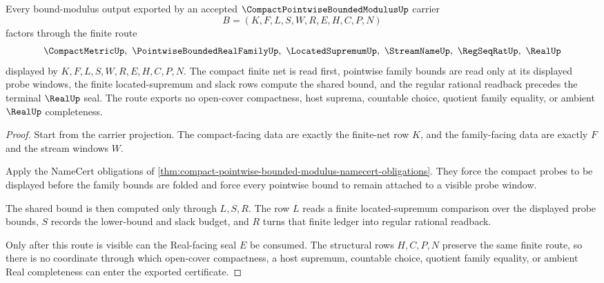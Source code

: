 \begin{theorem}
\label{thm:compact-pointwise-bounded-modulus-finite-net-bound}
Every bound-modulus output exported by an accepted $\CompactPointwiseBoundedModulusUp$ carrier
$$
B=(K,F,L,S,W,R,E,H,C,P,N)
$$
factors through the finite route
$$
\CompactMetricUp,\ \PointwiseBoundedRealFamilyUp,\ \LocatedSupremumUp,\ \StreamNameUp,\ \RegSeqRatUp,\ \RealUp
$$
displayed by $K,F,L,S,W,R,E,H,C,P,N$. The compact finite net is read first, pointwise family bounds are read only at its displayed probe windows, the finite located-supremum and slack rows compute the shared bound, and the regular rational readback precedes the terminal $\RealUp$ seal. The route exports no open-cover compactness, host suprema, countable choice, quotient family equality, or ambient $\RealUp$ completeness.
\end{theorem}
\begin{proof}
Start from the carrier projection. The compact-facing data are exactly the finite-net row $K$, and the family-facing data are exactly $F$ and the stream windows $W$.

Apply the NameCert obligations of \autoref{thm:compact-pointwise-bounded-modulus-namecert-obligations}. They force the compact probes to be displayed before the family bounds are folded and force every pointwise bound to remain attached to a visible probe window.

The shared bound is then computed only through $L,S,R$. The row $L$ reads a finite located-supremum comparison over the displayed probe bounds, $S$ records the lower-bound and slack budget, and $R$ turns that finite ledger into regular rational readback.

Only after this route is visible can the Real-facing seal $E$ be consumed. The structural rows $H,C,P,N$ preserve the same finite route, so there is no coordinate through which open-cover compactness, a host supremum, countable choice, quotient family equality, or ambient Real completeness can enter the exported certificate.
\end{proof}


